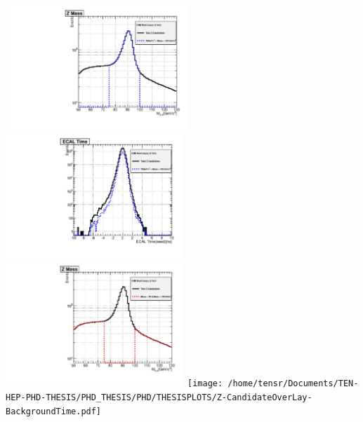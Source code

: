 \vspace{5mm}
\begin{minipage}{0.90\linewidth} 
\begin{center}
\mbox{
\includegraphics[height=0.55\textwidth, width=0.5\textwidth]{THESISPLOTS/Z-CandidateOverLay-SignalMass.pdf}
\includegraphics[height=0.55\textwidth, width=0.5\textwidth]{THESISPLOTS/Z-CandidateOverLay-SignalTime.pdf}}
\mbox{
\includegraphics[height=0.55\textwidth, width=0.5\textwidth]{THESISPLOTS/Z-CandidateOverLay-BackgroundMass.pdf}
\texttt{[image: /home/tensr/Documents/TEN-HEP-PHD-THESIS/PHD\_THESIS/PHD/THESISPLOTS/Z-CandidateOverLay-BackgroundTime.pdf]}}
\label{fig:Zmass}
\end{center}
\end{minipage}


